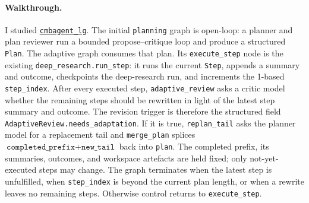 \documentclass[11pt,a4paper]{article}
\newcommand{\code}[1]{\texttt{#1}}
\newcommand{\cmbcommit}{\href{https://github.com/borisbolliet/cmbagent_lg/tree/d7d0592a714e4cc01c97f1b77afdd57a208b18db}{\code{cmbagent\_lg}}}
\begin{document}

\paragraph{Walkthrough.}
I studied \cmbcommit.  The initial \code{planning} graph is open-loop: a planner and plan reviewer run a bounded propose--critique loop and produce a structured \code{Plan}.  The adaptive graph consumes that plan.  Its \code{execute\_step} node is the existing \code{deep\_research.run\_step}: it runs the current \code{Step}, appends a summary and outcome, checkpoints the deep-research run, and increments the 1-based \code{step\_index}.  After every executed step, \code{adaptive\_review} asks a critic model whether the remaining steps should be rewritten in light of the latest step summary and outcome.  The revision trigger is therefore the structured field \code{AdaptiveReview.needs\_adaptation}.  If it is true, \code{replan\_tail} asks the planner model for a replacement tail and \code{merge\_plan} splices \(\texttt{completed\_prefix}+\texttt{new\_tail}\) back into \code{plan}.  The completed prefix, its summaries, outcomes, and workspace artefacts are held fixed; only not-yet-executed steps may change.  The graph terminates when the latest step is unfulfilled, when \code{step\_index} is beyond the current plan length, or when a rewrite leaves no remaining steps.  Otherwise control returns to \code{execute\_step}.
\end{document}
